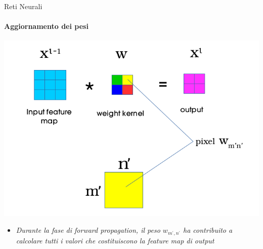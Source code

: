 \documentclass[
 ]{beamer}
\begin{document}
\begin{frame}{Reti Neurali}
    \framesubtitle{Aggiornamento dei pesi} 
    
    \begin{center}
      \includegraphics[scale = 0.4]{back_conv.png}
    \end{center}
  
    \smallskip
    
    \begin{itemize}
        \setlength\itemsep{1em}
        \item[] \large \emph{Durante la fase di forward propagation, il peso $w_{m^{\prime}, n^{\prime}}$ ha contribuito a calcolare tutti i valori che costituiscono la feature map di output}
    \end{itemize}
\end{frame}
\end{document}
